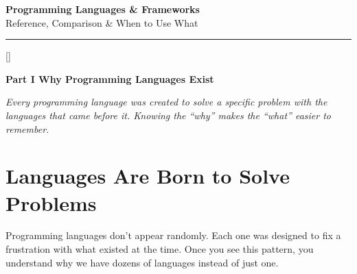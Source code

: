 \documentclass[11pt, letterpaper]{article}
\newcommand{\purplesections}{%
  \titleformat{\section}{\large\bfseries\color{sectionpurple}}{}{0em}{}[\color{sectionpurple}\titlerule]%
  \titleformat{\subsection}{\normalsize\bfseries\color{sectionpurple!80!black}}{}{0em}{}%
}
\newcommand{\partbanner}[3]{%
  \begin{tcolorbox}[colback=#1, colframe=#2, boxrule=1.2pt, arc=4pt,
    left=8pt, right=8pt, top=6pt, bottom=6pt]
    \begin{center}{\LARGE\bfseries #3}\end{center}
  \end{tcolorbox}%
}
\begin{document}
\begin{center}
  {\Huge\bfseries Programming Languages \& Frameworks}\\[6pt]
  {\large Reference, Comparison \& When to Use What}\\[4pt]
  \rule{\textwidth}{0.8pt}
\end{center}
\vspace{8pt}
\tableofcontents
\newpage

\purplesections
{}
\partbanner{part3bg}{sectionpurple}{Part I \quad Why Programming Languages Exist}

\vspace{6pt}
\begin{center}\small\itshape
  Every programming language was created to solve a specific problem with the languages
  that came before it. Knowing the ``why'' makes the ``what'' easier to remember.
\end{center}

\section*{Languages Are Born to Solve Problems}

Programming languages don't appear randomly. Each one was designed to fix a frustration with what existed at the time. Once you see this pattern, you understand why we have dozens of languages instead of just one.
\end{document}
